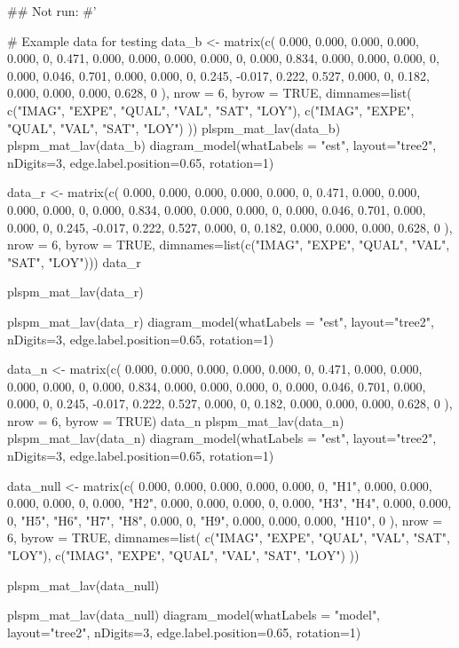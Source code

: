 \documentclass[a4paper]{book}
\begin{document}
\begin{Examples}
\begin{ExampleCode}

## Not run: 
#'

# Example data for testing
data_b <- matrix(c(
  0.000, 0.000, 0.000, 0.000, 0.000, 0,
  0.471, 0.000, 0.000, 0.000, 0.000, 0,
  0.000, 0.834, 0.000, 0.000, 0.000, 0,
  0.000, 0.046, 0.701, 0.000, 0.000, 0,
  0.245, -0.017, 0.222, 0.527, 0.000, 0,
  0.182, 0.000, 0.000, 0.000, 0.628, 0
), nrow = 6, byrow = TRUE,
dimnames=list(
  c("IMAG", "EXPE", "QUAL", "VAL", "SAT", "LOY"),
  c("IMAG", "EXPE", "QUAL", "VAL", "SAT", "LOY")
))
plspm_mat_lav(data_b)%
plspm_mat_lav(data_b)%
  diagram_model(whatLabels = "est", layout="tree2", nDigits=3,
                edge.label.position=0.65, rotation=1)


data_r <- matrix(c(
  0.000, 0.000, 0.000, 0.000, 0.000, 0,
  0.471, 0.000, 0.000, 0.000, 0.000, 0,
  0.000, 0.834, 0.000, 0.000, 0.000, 0,
  0.000, 0.046, 0.701, 0.000, 0.000, 0,
  0.245, -0.017, 0.222, 0.527, 0.000, 0,
  0.182, 0.000, 0.000, 0.000, 0.628, 0
), nrow = 6, byrow = TRUE,
dimnames=list(c("IMAG", "EXPE", "QUAL", "VAL", "SAT", "LOY")))
data_r

plspm_mat_lav(data_r)%

plspm_mat_lav(data_r)%
  diagram_model(whatLabels = "est", layout="tree2", nDigits=3,
                edge.label.position=0.65, rotation=1)

data_n <- matrix(c(
  0.000, 0.000, 0.000, 0.000, 0.000, 0,
  0.471, 0.000, 0.000, 0.000, 0.000, 0,
  0.000, 0.834, 0.000, 0.000, 0.000, 0,
  0.000, 0.046, 0.701, 0.000, 0.000, 0,
  0.245, -0.017, 0.222, 0.527, 0.000, 0,
  0.182, 0.000, 0.000, 0.000, 0.628, 0
), nrow = 6, byrow = TRUE)
data_n
plspm_mat_lav(data_n)%
plspm_mat_lav(data_n)%
  diagram_model(whatLabels = "est", layout="tree2", nDigits=3,
                edge.label.position=0.65, rotation=1)



data_null <- matrix(c(
  0.000, 0.000, 0.000, 0.000, 0.000, 0,
  "H1", 0.000, 0.000, 0.000, 0.000, 0,
  0.000, "H2", 0.000, 0.000, 0.000, 0,
  0.000, "H3", "H4", 0.000, 0.000, 0,
  "H5", "H6", "H7", "H8", 0.000, 0,
  "H9", 0.000, 0.000, 0.000, "H10", 0
), nrow = 6, byrow = TRUE,
dimnames=list(
  c("IMAG", "EXPE", "QUAL", "VAL", "SAT", "LOY"),
  c("IMAG", "EXPE", "QUAL", "VAL", "SAT", "LOY")
))

plspm_mat_lav(data_null)%

plspm_mat_lav(data_null)%
  diagram_model(whatLabels = "model", layout="tree2", nDigits=3,
                edge.label.position=0.65, rotation=1)


\end{ExampleCode}
\end{Examples}
\end{document}
